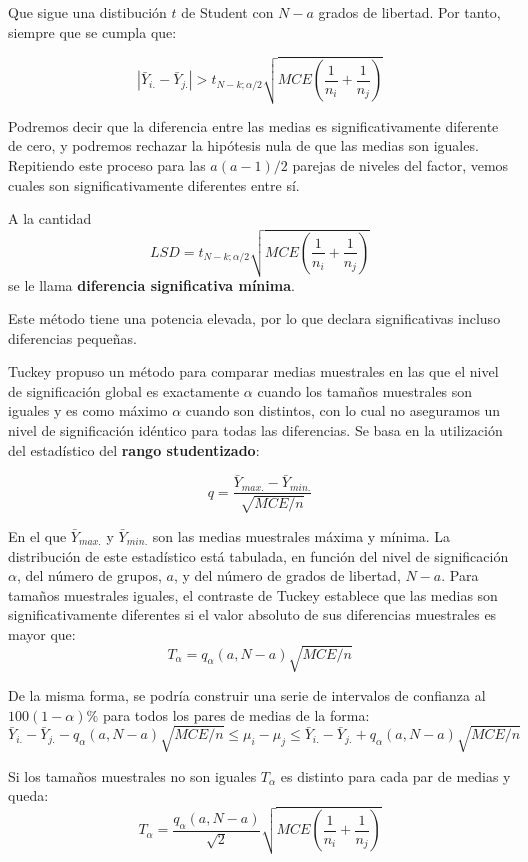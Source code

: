Que sigue una distibuci\'on $t$ de Student con $N-a$ grados de libertad. Por tanto, siempre que se cumpla que:

\[|\bar{Y}_{i.}-\bar{Y}_{j.}|>t_{N-k;\alpha/2}\sqrt{MCE\left(\dfrac{1}{n_i}+\dfrac{1}{n_j}\right)}\]

Podremos decir que la diferencia entre las medias es significativamente diferente de cero, y podremos rechazar la hip\'otesis nula de que las medias son iguales. Repitiendo este proceso para las $a(a-1)/2$ parejas de niveles del factor, vemos cuales son significativamente diferentes entre s\'i.

A la cantidad
\[LSD=t_{N-k;\alpha/2}\sqrt{MCE\left(\dfrac{1}{n_i}+\dfrac{1}{n_j}\right)}\]
se le llama \textbf{diferencia significativa m\'inima}.

Este m\'etodo tiene una potencia elevada, por lo que declara significativas incluso diferencias peque\~nas.



Tuckey propuso un m\'etodo para comparar medias muestrales en las que el nivel de significaci\'on global es exactamente $\alpha$ cuando los tama\~nos muestrales son iguales y es como m\'aximo $\alpha$ cuando son distintos, con lo cual no aseguramos un nivel de significaci\'on id\'entico para todas las diferencias. Se basa en la utilizaci\'on del estad\'istico del \textbf{rango studentizado}:

\[q=\dfrac{\bar{Y}_{max.}-\bar{Y}_{min.}}{\sqrt{MCE/n}}\]

En el que $\bar{Y}_{max.}$ y $\bar{Y}_{min.}$ son las medias muestrales m\'axima y m\'inima. La distribuci\'on de este estad\'istico est\'a tabulada, en funci\'on del nivel de significaci\'on $\alpha$, del n\'umero de grupos, $a$, y del n\'umero de grados de libertad, $N-a$. Para tama\~nos muestrales iguales, el contraste de Tuckey establece que las medias son significativamente diferentes si el valor absoluto de sus diferencias muestrales es mayor que:
\[T_{\alpha}=q_{\alpha}(a,N-a)\sqrt{MCE/n}\]

De la misma forma, se podr\'ia construir una serie de intervalos de confianza al $100(1-\alpha)\%$ para todos los pares de medias de la forma:
\[\bar{Y}_{i.}-\bar{Y}_{j.}-q_{\alpha}(a,N-a)\sqrt{MCE/n}\leq\mu_i-\mu_j\leq\bar{Y}_{i.}-\bar{Y}_{j.}+q_{\alpha}(a,N-a)\sqrt{MCE/n}\]

Si los tama\~nos muestrales no son iguales $T_{\alpha}$ es distinto para cada par de medias y queda:
\[T_{\alpha}=\dfrac{q_{\alpha}(a,N-a)}{\sqrt{2}}\sqrt{MCE\left(\dfrac{1}{n_i}+\dfrac{1}{n_j}\right)}\]



